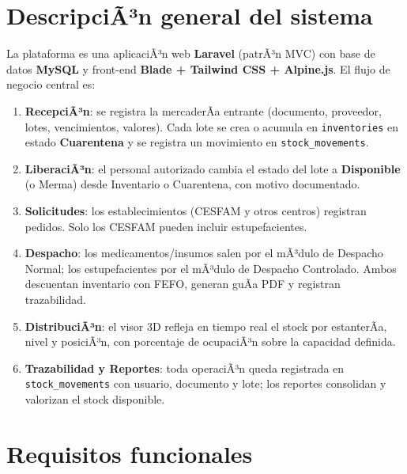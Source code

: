 ﻿\documentclass[a4paper, 12pt]{article}
\begin{document}
\section{DescripciÃ³n general del sistema}

La plataforma es una aplicaciÃ³n web \textbf{Laravel} (patrÃ³n MVC) con base de datos \textbf{MySQL} y front-end \textbf{Blade + Tailwind CSS + Alpine.js}. El flujo de negocio central es:

\begin{enumerate}
    \item \textbf{RecepciÃ³n}: se registra la mercaderÃ­a entrante (documento, proveedor, lotes, vencimientos, valores). Cada lote se crea o acumula en \texttt{inventories} en estado \textbf{Cuarentena} y se registra un movimiento en \texttt{stock\_movements}.
    \item \textbf{LiberaciÃ³n}: el personal autorizado cambia el estado del lote a \textbf{Disponible} (o Merma) desde Inventario o Cuarentena, con motivo documentado.
    \item \textbf{Solicitudes}: los establecimientos (CESFAM y otros centros) registran pedidos. Solo los CESFAM pueden incluir estupefacientes.
    \item \textbf{Despacho}: los medicamentos/insumos salen por el mÃ³dulo de Despacho Normal; los estupefacientes por el mÃ³dulo de Despacho Controlado. Ambos descuentan inventario con FEFO, generan guÃ­a PDF y registran trazabilidad.
    \item \textbf{DistribuciÃ³n}: el visor 3D refleja en tiempo real el stock por estanterÃ­a, nivel y posiciÃ³n, con porcentaje de ocupaciÃ³n sobre la capacidad definida.
    \item \textbf{Trazabilidad y Reportes}: toda operaciÃ³n queda registrada en \texttt{stock\_movements} con usuario, documento y lote; los reportes consolidan y valorizan el stock disponible.
\end{enumerate}

\section{Requisitos funcionales}
\end{document}
